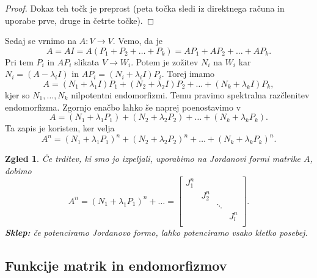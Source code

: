 \documentclass[10pt, a4paper]{article}
\newtheorem{zgled}{Zgled}[section]
\newenvironment{noticeC}{%
  \tcolorbox[%
  notitle,
  empty,
  enhanced,  %
  breakable,
  coltext=black, 
  fontupper=\rmfamily,
  parbox=false,
  noparskip,
  sharp corners,
  boxrule=-1pt,  %
  frame hidden,
  left=7pt,  %
  right=7pt,
  top=5pt,
  bottom=5pt,
  before skip=2.5ex plus 2pt,
  after skip=2.5ex plus 2pt,
  overlay unbroken and last={%
  },
  ]}
{\endtcolorbox}
\newenvironment{dokaz}%
  {\begin{noticeC}\begin{proof}}%
  {\end{proof}\end{noticeC}}
\begin{document}
\begin{dokaz}
    Dokaz teh točk je preprost (peta točka sledi iz direktnega računa in uporabe prve, druge in četrte točke).
\end{dokaz}

Sedaj se vrnimo na $A: V \rightarrow V$. Vemo, da je $$A = AI = A(P_1 + P_2 + \dots + P_k) = AP_1 + AP_2 + \dots + AP_k.$$
Pri tem $P_i$ in $AP_i$ slikata $V \rightarrow W_i$.
Potem je zožitev $N_i$ na $W_i$ kar $N_i = (A - \lambda_i I)$ in $AP_i = (N_i + \lambda_i I)P_i.$
Torej imamo $$A = (N_1 + \lambda_1 I)P_1 + (N_2 + \lambda_2 I)P_2 + \dots + (N_k + \lambda_k I)P_k,$$
kjer so $N_1, \dots, N_k$ nilpotentni endomorfizmi. Temu pravimo spektralna razčlenitev endomorfizma.
Zgornjo enačbo lahko še naprej poenostavimo v 
$$A = (N_1 + \lambda_1 P_1) + (N_2 + \lambda_2 P_2) + \dots + (N_k + \lambda_k P_k).$$
Ta zapis je koristen, ker velja 
$$A^n = (N_1 + \lambda_1 P_1)^n + (N_2 + \lambda_2 P_2)^n + \dots + (N_k + \lambda_k P_k)^n.$$
\begin{zgled}
    Če trditev, ki smo jo izpeljali, uporabimo na Jordanovi formi matrike $A$, dobimo 
    $$A^n = (N_1 + \lambda_1 P_1)^n + \dots = \begin{bmatrix}
        J_1^n & & & \\
        & J_2^n & & \\
         & & \ddots & \\
        & & & J_l^n \\
    \end{bmatrix}.$$
    \textbf{Sklep:} 
    če potenciramo Jordanovo formo, lahko potenciramo vsako kletko posebej.
\end{zgled}

\subsection{Funkcije matrik in endomorfizmov}
\end{document}

